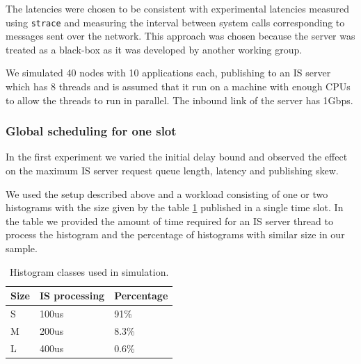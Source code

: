 The latencies were chosen to be consistent with experimental latencies measured using {\tt strace} and measuring the interval between system calls corresponding to messages sent over the network. This approach was chosen because the server was treated as a black-box as it was developed by another working group. 

We simulated 40 nodes with 10 applications each, publishing to an IS server which has 8 threads and is assumed that it run on a machine with enough CPUs to allow the threads to run in parallel. The inbound link of the server has 1Gbps.

\subsubsection*{Global scheduling for one slot}

In the first experiment we varied the initial delay bound and observed the effect on the maximum IS server request queue length, latency and publishing skew. 

We used the setup described above and a workload consisting of one or two histograms with the size given by the table \ref{tab:histosize} published in a single time slot. In the table we provided the amount of time required for an IS server thread to process the histogram and the percentage of histograms with similar size in our sample. 

\begin{table}
\centering
\begin{tabular}[ht]{ | l | l | l | }
  \hline                        
  Size & IS processing & Percentage \\
  \hline                        
  S & 100us & 91\% \\
  \hline  
  M & 200us & 8.3\% \\
  \hline  
  L & 400us & 0.6\% \\
  \hline  
\end{tabular}
\caption{Histogram classes used in simulation.}
\label{tab:histosize}
\end{table}


